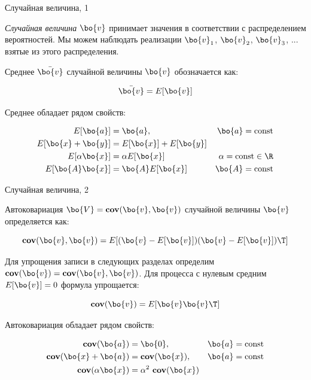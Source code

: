 \documentclass{beamer}
\begin{document}
\begin{frame}{Случайная величина, 1}
	\begin{flushleft}
		
		\emph{Случайная величина} $\bo{v}$ принимает значения в соответствии с распределением вероятностей. Мы можем наблюдать реализации $\bo{v}_1$, $\bo{v}_2$, $\bo{v}_3$, ... взятые из этого распределения.
		
		\bigskip
		
		Среднее $\bar{\bo{v}}$ случайной величины $\bo{v}$ обозначается как:
		
		\begin{equation}
			\bar{\bo{v}} = E[\bo{v}]
		\end{equation}
		
		Среднее обладает рядом свойств:
		
		\begin{align}
			E[\bo{a}] &= \bo{a}, & \bo{a}= \text{const} \\
			E[\bo{x}+\bo{y}] &= E[\bo{x}] + E[\bo{y}] &\\
			E[\alpha \bo{x}] &= \alpha  E[\bo{x}]  & \alpha = \text{const} \in \R \\
			E[\bo{A} \bo{x}] &= \bo{A}  E[\bo{x}] & \bo{A} = \text{const}
		\end{align}
		
		
	\end{flushleft}
\end{frame}



\begin{frame}{Случайная величина, 2}
	\begin{flushleft}
		
		Автоковариация $\bo{V} = \textbf{cov}(\bo{v}, \bo{v})$ случайной величины $\bo{v}$ определяется как:
		
		\begin{equation}
			\textbf{cov}(\bo{v}, \bo{v}) = E[(\bo{v} - E[\bo{v}])(\bo{v} - E[\bo{v}])\T]
		\end{equation}
		
		Для упрощения записи в следующих разделах определим $\textbf{cov}(\bo{v}) = \textbf{cov}(\bo{v}, \bo{v})$. Для процесса с нулевым средним $E[\bo{v}] = 0$ формула упрощается:
		
		\begin{equation}
			\textbf{cov}(\bo{v}) = E[\bo{v}\bo{v}\T]
		\end{equation}
		
		Автоковариация обладает рядом свойств:
		
		\begin{align}
			\textbf{cov}(\bo{a}) &= \bo{0}, & \bo{a}= \text{const} 
			\\
			\textbf{cov}(\bo{x}+\bo{a}) &= \textbf{cov}(\bo{x}), & \bo{a}= \text{const} 
			\\
			\textbf{cov}(\alpha \bo{x}) &= \alpha^2 \ \textbf{cov}(\bo{x}) &
		\end{align}
		
		
		
	\end{flushleft}
\end{frame}
\end{document}
